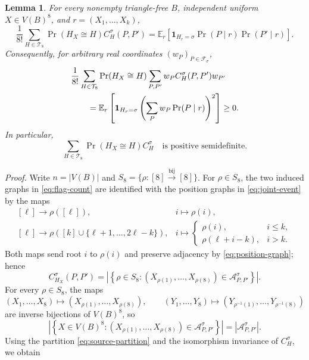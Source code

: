 \documentclass[11pt]{article}
\newcommand{\E}{\mathbb E}
\newcommand{\ind}{\mathbf 1}
\newtheorem{lemma}{Lemma}
\begin{document}
\begin{lemma}\label{lem:exact-flag-square}
For every nonempty triangle-free $B$, independent uniform $X\in V(B)^8$, and $r=(X_1,\ldots,X_k)$,
\begin{equation}\label{eq:flag-entry-average}
\frac1{8!}\sum_{H\in\mathcal T_8}\Pr(H_X\cong H)C_H^\sigma(P,P')
=\E_r\left[\ind_{H_r=\sigma}\Pr(P\mid r)\Pr(P'\mid r)\right].
\end{equation}
Consequently, for arbitrary real coordinates $(w_P)_{P\in\mathcal F_\sigma}$,
\begin{align}
&\frac1{8!}\sum_{H\in\mathcal T_8}\Pr(H_X\cong H)
\sum_{P,P'}w_PC_H^\sigma(P,P')w_{P'}\notag\\
&\qquad=\E_r\left[\ind_{H_r=\sigma}
\left(\sum_Pw_P\Pr(P\mid r)\right)^2\right]\geq0.
\label{eq:flag-square}
\end{align}
In particular,
\begin{equation}\label{eq:averaged-count-psd}
\sum_{H\in\mathcal T_8}\Pr(H_X\cong H)C_H^\sigma
\quad\text{is positive semidefinite}.
\end{equation}
\end{lemma}
\noindent\emph{Proof.}
Write $n=|V(B)|$ and
$S_8=\{\rho:[8]\overset{\mathrm{bij}}{\longrightarrow}[8]\}$.
For $\rho\in S_8$, the two induced graphs in \eqref{eq:flag-count}
are identified with the position graphs in \eqref{eq:joint-event} by the maps
\[
\begin{array}{ll}
[\ell]\longrightarrow\rho([\ell]),&
i\longmapsto\rho(i),\\[3pt]
[\ell]\longrightarrow\rho([k]\cup\{\ell+1,\ldots,2\ell-k\}),&
i\longmapsto
\begin{cases}
\rho(i),&i\leq k,\\
\rho(\ell+i-k),&i>k.
\end{cases}
\end{array}
\]
Both maps send root $i$ to $\rho(i)$ and preserve adjacency by
\eqref{eq:position-graph}; hence
\[
C_{H_X}^\sigma(P,P')
=\left|\left\{\rho\in S_8:
(X_{\rho(1)},\ldots,X_{\rho(8)})\in\mathcal A^\sigma_{P,P'}\right\}\right|.
\]
For every $\rho\in S_8$, the maps
\[
(X_1,\ldots,X_8)\longmapsto(X_{\rho(1)},\ldots,X_{\rho(8)}),
\qquad
(Y_1,\ldots,Y_8)\longmapsto(Y_{\rho^{-1}(1)},\ldots,Y_{\rho^{-1}(8)})
\]
are inverse bijections of $V(B)^8$, so
\[
\left|\left\{X\in V(B)^8:
(X_{\rho(1)},\ldots,X_{\rho(8)})\in\mathcal A^\sigma_{P,P'}\right\}\right|
=|\mathcal A^\sigma_{P,P'}|.
\]
Using the partition \eqref{eq:source-partition} and the isomorphism
invariance of $C_H^\sigma$, we obtain
\end{document}
